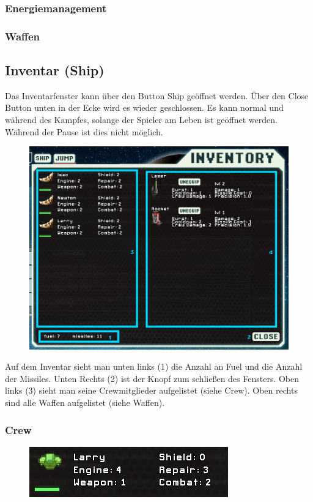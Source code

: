 \documentclass[fontsize=12pt,paper=a4,twoside]{scrartcl}
\begin{document}
\subsubsection{Energiemanagement}


\subsubsection{Waffen}


\subsection{Inventar (Ship)}

Das Inventarfenster kann über den Button Ship geöffnet werden. Über den Close Button unten in der Ecke wird es wieder geschlossen. Es kann normal und während des Kampfes, solange der Spieler am Leben ist geöffnet werden. Während der Pause ist dies nicht möglich. 

\begin{figure}[H]
\centering
\includegraphics[width=0.8\linewidth]{DasSpiel/Inventar/inventar.png}
\end{figure} 

Auf dem Inventar sieht man unten links (1) die Anzahl an Fuel und die Anzahl der Missiles. Unten Rechts (2) ist der Knopf zum schließen des Fensters. Oben links (3) sieht man seine Crewmitglieder aufgelistet (siehe Crew). Oben rechts sind alle Waffen aufgelistet (siehe Waffen). 

\subsubsection{Crew}

\begin{figure}[H]
\centering
\includegraphics[width=0.8\linewidth]{DasSpiel/Inventar/crew.png}
\end{figure} 
\end{document}
